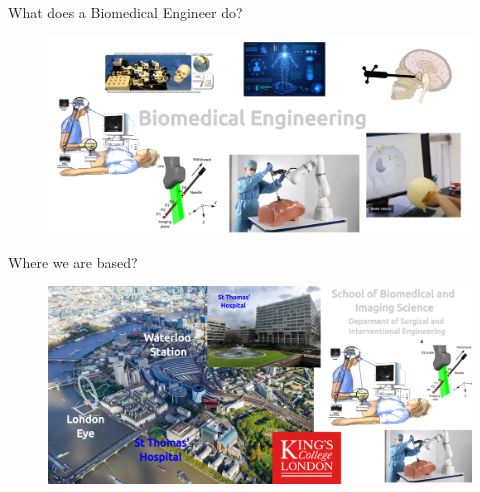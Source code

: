 {
\begin{frame}{}

\BigSizeFont
What does a Biomedical Engineer do?
\end{frame}
}




{
\begin{frame}{}

  \begin{figure}
  \centering
  \includegraphics[width=1.0\textwidth]{./figures/biomedical-engineer/versions/drawing-v01.png}
  \end{figure}

\end{frame}
}




{
\begin{frame}{Where we are based?}

  \begin{figure}
  \centering
  \includegraphics[width=1.0\textwidth]{./figures/where-we-are-based/versions/drawing-v02.png}
  \end{figure}

\end{frame}
}
